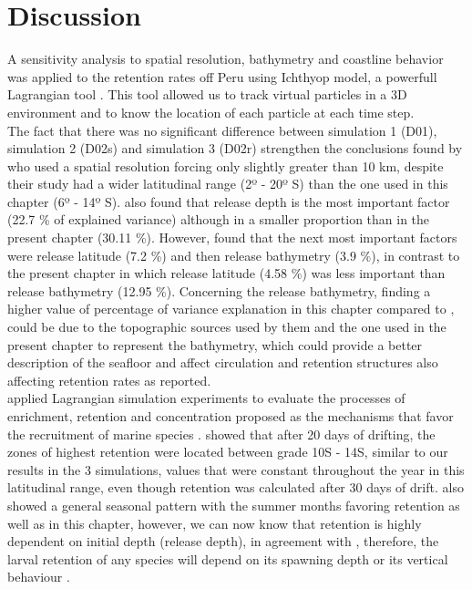 \clearpage

\section{Discussion}\label{Chap2Disc}

A sensitivity analysis to spatial resolution, bathymetry and coastline behavior was applied to the retention rates off Peru using Ichthyop model, a powerfull Lagrangian tool \citep{LettVerl2008}. This tool allowed us to track virtual particles in a 3D environment and to know the location of each particle at each time step.\\

The fact that there was no significant difference between simulation 1 (D01), simulation 2 (D02s) and simulation 3 (D02r) strengthen the conclusions found by \citep{BrocLett2008} who used a spatial resolution forcing only slightly greater than 10 km, despite their study had a wider latitudinal range (2º - 20º S) than the one used in this chapter (6º - 14º S). \cite{BrocLett2008} also found that release depth is the most important factor (22.7 \% of explained variance) although in a smaller proportion than in the present chapter (30.11 \%). However, \cite{BrocLett2008} found that the next most important factors were release latitude (7.2 \%) and then release bathymetry (3.9 \%), in contrast to the present chapter in which release latitude (4.58 \%) was less important than release bathymetry (12.95 \%). Concerning the release bathymetry, finding a higher value of percentage of variance explanation in this chapter compared to \cite{BrocLett2008}, could be due to the topographic sources \citep{SmitSand1997} used by them and the one used in the present chapter \citep{BeckSand2009} to represent the bathymetry, which could provide a better description of the seafloor and affect circulation and retention structures also affecting retention rates as \cite{RojaLand2014} reported.\\

\cite{LettPenv2007} applied Lagrangian simulation experiments to evaluate the processes of enrichment, retention and concentration proposed as the mechanisms that favor the recruitment of marine species \citep{Baku1998, Baku2010}. \cite{LettPenv2007} showed that after 20 days of drifting, the zones of highest retention were located between grade 10\textdegree S - 14\textdegree S, similar to our results in the 3 simulations, values that were constant throughout the year in this latitudinal range, even though retention was calculated after 30 days of drift. \cite{LettPenv2007} also showed a general seasonal pattern with the summer months favoring retention as well as in this chapter, however, we can now know that retention is highly dependent on initial depth (release depth), in agreement with \cite{BrocLett2008}, therefore, the larval retention of any species will depend on its spawning depth or its vertical behaviour \citep{OspiPara2012}.\\

